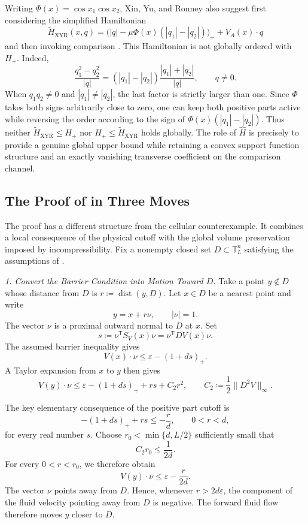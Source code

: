 \documentclass[11pt,reqno,noamsfonts]{amsart}
\theoremstyle{definition}
\theoremstyle{remark}
\newcommand{\T}{\mathbb T}
\newcommand{\dist}{\operatorname{dist}}
\begin{document}
Writing $\Phi(x)=\cos x_1\cos x_2$, Xin, Yu, and Ronney also suggest
first considering the simplified Hamiltonian
\[
  \widetilde H_{\mathrm{XYR}}(x,q)
  =
  \bigl(|q|-\mu\Phi(x)(|q_1|-|q_2|)\bigr)_+
  +V_A(x)\cdot q
\]
and then invoking comparison
\cite[Section~5.2]{XinYuRonney2024}.  This Hamiltonian is not globally
ordered with $H_+$.  Indeed,
\[
  \frac{q_1^2-q_2^2}{|q|}
  =
  (|q_1|-|q_2|)
  \frac{|q_1|+|q_2|}{|q|},
  \qquad q\ne0.
\]
When $q_1q_2\ne0$ and $|q_1|\ne|q_2|$, the last factor is strictly
larger than one.  Since $\Phi$ takes both signs arbitrarily close to
zero, one can keep both positive parts active while reversing the order
according to the sign of $\Phi(x)(|q_1|-|q_2|)$.  Thus neither
$\widetilde H_{\mathrm{XYR}}\le H_+$ nor
$H_+\le\widetilde H_{\mathrm{XYR}}$ holds globally.  The role of
$\widehat H$ is precisely to provide a genuine global upper bound while
retaining a convex support function structure and an exactly vanishing
transverse coefficient on the comparison channel.

\subsection{The Proof of  in Three Moves}

The proof has a different structure from the cellular counterexample.
It combines a local consequence of the physical cutoff with the global
volume preservation imposed by incompressibility. Fix a nonempty closed
set $D\subset\T_L^n$ satisfying the assumptions of
.

\textit{1. Convert the Barrier Condition into Motion Toward $D$.}
Take a point $y\notin D$ whose distance from $D$ is
  $r\coloneqq\dist(y,D)$.
Let $x\in D$ be a nearest point and write
\[
  y=x+r\nu,
  \qquad |\nu|=1.
\]
The vector $\nu$ is a proximal outward normal to $D$ at $x$. Set
\[
  s\coloneqq
  \nu^{\mathsf T}S_V(x)\nu
  =
  \nu^{\mathsf T}DV(x)\nu.
\]
The assumed barrier inequality gives
\[
  V(x)\cdot\nu
  \le
  \varepsilon-(1+ds)_+.
\]
A Taylor expansion from $x$ to $y$ then gives
\[
  V(y)\cdot\nu
  \le
  \varepsilon-(1+ds)_++rs+C_2r^2,
  \qquad
  C_2\coloneqq\frac12\|D^2V\|_\infty.
\]

The key elementary consequence of the positive part cutoff is
\[
  -(1+ds)_++rs\le-\frac rd,
  \qquad 0<r<d,
\]
for every real number $s$. Choose $r_0<\min\{d,L/2\}$ sufficiently
small that
\[
  C_2r_0\le\frac1{2d}.
\]
For every $0<r<r_0$, we therefore obtain
\[
  V(y)\cdot\nu
  \le
  \varepsilon-\frac r{2d}.
\]
The vector $\nu$ points away from $D$. Hence, whenever
$r>2d\varepsilon$, the component of the fluid velocity pointing away
from $D$ is negative. The forward fluid flow therefore moves $y$
closer to $D$.
\end{document}
